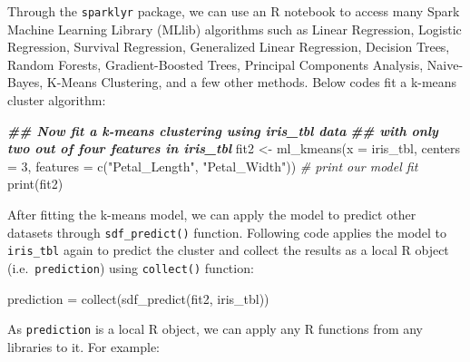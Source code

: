 \documentclass[
  12pt,
]{krantz}
\makeatletter
\newenvironment{Shaded}{\begin{snugshade}}{\end{snugshade}}
\newcommand{\AttributeTok}[1]{\textcolor[rgb]{0.61,0.61,0.61}{#1}}
\newcommand{\CommentTok}[1]{\textcolor[rgb]{0.37,0.37,0.37}{\textit{#1}}}
\newcommand{\DecValTok}[1]{\textcolor[rgb]{0.06,0.06,0.06}{#1}}
\newcommand{\DocumentationTok}[1]{\textcolor[rgb]{0.37,0.37,0.37}{\textbf{\textit{#1}}}}
\newcommand{\FunctionTok}[1]{\textcolor[rgb]{0,0,0}{#1}}
\newcommand{\NormalTok}[1]{#1}
\newcommand{\OtherTok}[1]{\textcolor[rgb]{0.37,0.37,0.37}{#1}}
\newcommand{\StringTok}[1]{\textcolor[rgb]{0.5,0.5,0.5}{#1}}
\newenvironment{kframe}{%
\medskip{}
\setlength{\fboxsep}{.8em}
 \def\at@end@of@kframe{}%
 \ifinner\ifhmode%
  \def\at@end@of@kframe{\end{minipage}}%
  \begin{minipage}{\columnwidth}%
 \fi\fi%
 \def\FrameCommand##1{\hskip\@totalleftmargin \hskip-\fboxsep
 \colorbox{shadecolor}{##1}\hskip-\fboxsep
     \hskip-\linewidth \hskip-\@totalleftmargin \hskip\columnwidth}%
 \MakeFramed {\advance\hsize-\width
   \@totalleftmargin\z@ \linewidth\hsize
   \@setminipage}}%
 {\par\unskip\endMakeFramed%
 \at@end@of@kframe}
\renewenvironment{Shaded}{\begin{kframe}}{\end{kframe}}
\makeatother
\begin{document}
Through the \texttt{sparklyr} package, we can use an R notebook to access many Spark Machine Learning Library (MLlib) algorithms such as Linear Regression, Logistic Regression, Survival Regression, Generalized Linear Regression, Decision Trees, Random Forests, Gradient-Boosted Trees, Principal Components Analysis, Naive-Bayes, K-Means Clustering, and a few other methods. Below codes fit a k-means cluster algorithm:

\begin{Shaded}
\begin{Highlighting}[]
\DocumentationTok{\#\# Now fit a k{-}means clustering using iris\_tbl data}
\DocumentationTok{\#\# with only two out of four features in iris\_tbl}
\NormalTok{fit2 }\OtherTok{\textless{}{-}} \FunctionTok{ml\_kmeans}\NormalTok{(}\AttributeTok{x =}\NormalTok{ iris\_tbl, }\AttributeTok{centers =} \DecValTok{3}\NormalTok{,}
                    \AttributeTok{features =} \FunctionTok{c}\NormalTok{(}\StringTok{"Petal\_Length"}\NormalTok{, }\StringTok{"Petal\_Width"}\NormalTok{))}
\CommentTok{\# print our model fit}
\FunctionTok{print}\NormalTok{(fit2)}
\end{Highlighting}
\end{Shaded}

After fitting the k-means model, we can apply the model to predict other datasets through \texttt{sdf\_predict()} function. Following code applies the model to \texttt{iris\_tbl} again to predict the cluster and collect the results as a local R object (i.e.~\texttt{prediction}) using \texttt{collect()} function:

\begin{Shaded}
\begin{Highlighting}[]
\NormalTok{prediction }\OtherTok{=} \FunctionTok{collect}\NormalTok{(}\FunctionTok{sdf\_predict}\NormalTok{(fit2, iris\_tbl))}
\end{Highlighting}
\end{Shaded}

As \texttt{prediction} is a local R object, we can apply any R functions from any libraries to it. For example:
\end{document}
